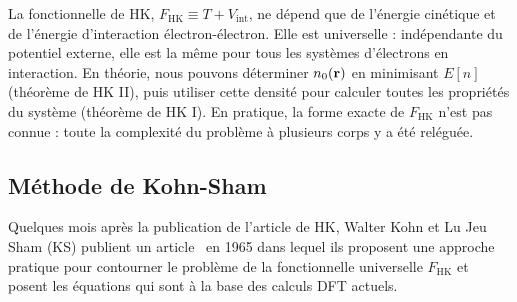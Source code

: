 La fonctionnelle de HK, $F_\text{HK}\equiv T+V_\text{int}$, ne dépend que de l'énergie cinétique et de l'énergie d'interaction électron-électron. Elle est universelle : indépendante du potentiel externe, elle est la même pour tous les systèmes d'électrons en interaction. En théorie, nous pouvons déterminer $n_0(\mathbf{r})$ en minimisant $E[n]$ (théorème de HK II), puis utiliser cette densité pour calculer toutes les propriétés du système (théorème de HK I). En pratique, la forme exacte de $F_\text{HK}$ n'est pas connue : toute la complexité du problème à plusieurs corps y a été reléguée.

\subsection{Méthode de Kohn-Sham}\label{sec:KS}

Quelques mois après la publication de l'article de HK, Walter Kohn et Lu Jeu Sham (KS) publient un article~\cite{kohnSelfConsistentEquationsIncluding1965} en 1965 dans lequel ils proposent une approche pratique pour contourner le problème de la fonctionnelle universelle $F_\text{HK}$ et posent les équations qui sont à la base des calculs DFT actuels.

\bigskip
{}


